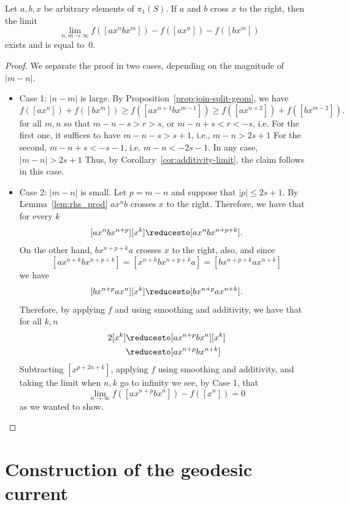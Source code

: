 \begin{proposition}\label{prop:join-split-alg}
Let $a,b,x$ be arbitrary elements of $\pi_1(S)$.
  If $a$ and $b$ cross $x$ to the right, then the limit
  \[
    \lim_{n,m\to \infty} f([a x^n b x^m]) - f([ax^n]) - f([bx^m])
  \]
  exists and is equal to~$0$.
\end{proposition}
\begin{proof}
We separate the proof in two cases, depending on the magnitude of $|m-n|$.
\begin{itemize}
    \item Case 1: $|n-m|$ is large.  By Proposition~\ref{prop:join-split-geom}, we have
  \[
    f([a x^n]) + f([b x^{m}]) \ge f([a x^{n+1} b x^{m-1}])
      \ge f([a x^{n+2}]) + f([b x^{m-2}]).
  \]
  for all $m,n$ so that $m-n -s >r > s$, or $m-n+s<r<-s$, i.e.
  For the first one, it suffices to have $m-n-s > s+1$, i.e., $m-n>2s+1$
  For the second, $m-n+s<-s-1$, i.e. $m-n<-2s-1$.
  In any case, $|m-n|>2s+1$
  Thus, by Corollary~\ref{cor:additivity-limit}, the claim follows in this case.
  \item Case 2: $|m-n|$ is small.  Let $p=m-n$ and suppose that $|p| \leq 2s+1$. By Lemma~\ref{lem:rhs_prod}  $ax^nb$ crosses $x$ to the right. Therefore, we have that for every $k$
  \[
  [ax^nbx^{n+p}] [x^k] \reducesto [ax^nbx^{n+p+k}].
  \]
  On the other hand, $bx^{n+p+k}a$ crosses $x$ to the right, also, and since
  \[
  [ax^{n+k}bx^{n+p+k}]=[x^{n+k}bx^{n+p+k}a]=[bx^{n+p+k}ax^{n+k}]
  \]
  we have
  \[
  [bx^{n+p}ax^{n}] [x^k] \reducesto [bx^{n+p}ax^{n+k}].
  \]  
  Therefore, by applying $f$ and using smoothing and additivity, we have that
  for all $k, n$
  \begin{align*}
  [ax^{n+p} bx^{n-k}] 2[x^k] & \reducesto  [ax^{n+p} bx^{n}] [x^k]  \\
  &\reducesto  [ax^{n+p} bx^{n+k}]
  \end{align*}
  Subtracting $[x^{p+2n+k}]$, applying $f$ using smoothing and additivity, and taking the limit when $n,k$ go to infinity we see, by Case 1, that
  \[
  \lim_{n \to \infty} f([ax^{n+p}bx^n])-f([x^n])=0
  \]  
  as we wanted to show.
\end{itemize}
 

\end{proof}

\section{Construction of the geodesic current}

